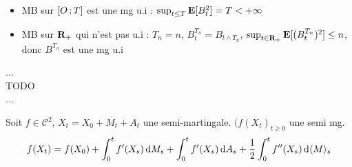 \begin{ex}
	\begin{itemize}
		\item[\textbullet] MB sur $\mathopen{}\mathclose{\left[O\mathclose{}\mathpunct{};T\right]}$ est une mg u.i : $\sup_{t \leq T} \mathbf{E}[B_t^2] = T < +\infty$
		\item[\textbullet] MB sur $\mathbf{R}_+$ qui n'est pas u.i : $T_n = n$, $B_t^{T_n} = B_{t \wedge T_n}$, $\sup_{t \in \mathbf{R}_+} \mathbf{E}[(B_t^{T_n})^2] \leq n$, donc $B^{T_n}$ est une mg u.i
	\end{itemize}
\end{ex}

...\\
TODO\\
...\\

\begin{thm}
	Soit $f \in \mathcal{C}^2$, $X_t = X_0 + M_t + A_t$ une semi-martingale.
	$(f(X_t)_{t \geq  0}$ une semi mg.
	$$f(X_t) = f(X_0) + \int_0^t f'(X_s) \mathop{}\mathopen{}\mathrm{d} M_s + \int_0^t f'(X_s) \mathop{}\mathopen{}\mathrm{d} A_s + \frac{1}{2} \int_0^t f''(X_s) \mathop{}\mathopen{}\mathrm{d} \langle M \rangle_s$$
\end{thm}